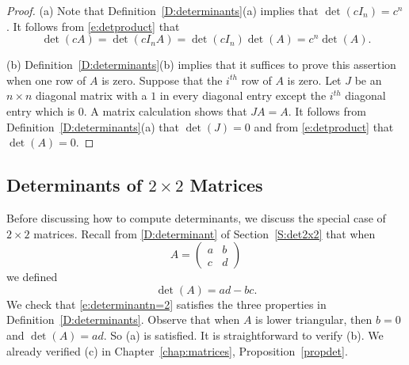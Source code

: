 \documentclass{ximera}
\begin{document}
\begin{proof}  (a) Note that Definition~\ref{D:determinants}(a) implies that 
$\det(cI_n)=c^n$.  It follows from \eqref{e:detproduct} that
\[
\det(cA) = \det(cI_n A) = \det(cI_n)\det(A) = c^n\det(A).
\]

(b)  Definition~\ref{D:determinants}(b) implies that it suffices to prove 
this assertion when one row of $A$ is zero.  Suppose that the $i^{th}$ row 
of $A$ is zero.  Let $J$ be an $n\times n$ 
diagonal matrix with a $1$ in every diagonal entry except the $i^{th}$ 
diagonal entry which is $0$.  A matrix calculation shows that $JA=A$. 
It follows from Definition~\ref{D:determinants}(a) that $\det(J)=0$ and 
from \eqref{e:detproduct} that $\det(A)=0$.  \end{proof} 



\subsection*{Determinants of $2\times 2$ Matrices}
 
Before discussing how to compute determinants, we discuss the
special case of $2\times 2$ matrices.  Recall from \eqref{D:determinant} of 
Section~\ref{S:det2x2} that when 
\[
A=\left(\begin{array}{cc} a & b\\c & d \end{array}\right)
\]
we defined 
\begin{equation}  \label{e:determinantn=2}
\det(A)=ad-bc.
\end{equation}
We check that \eqref{e:determinantn=2} satisfies the three
properties in Definition~\ref{D:determinants}.  Observe that when
$A$ is lower triangular, then $b=0$ and $\det(A)=ad$.  So (a) is
satisfied.  It is straightforward to verify (b).  We already
verified (c) in Chapter~\ref{chap:matrices}, Proposition~\ref{propdet}.
\end{document}
